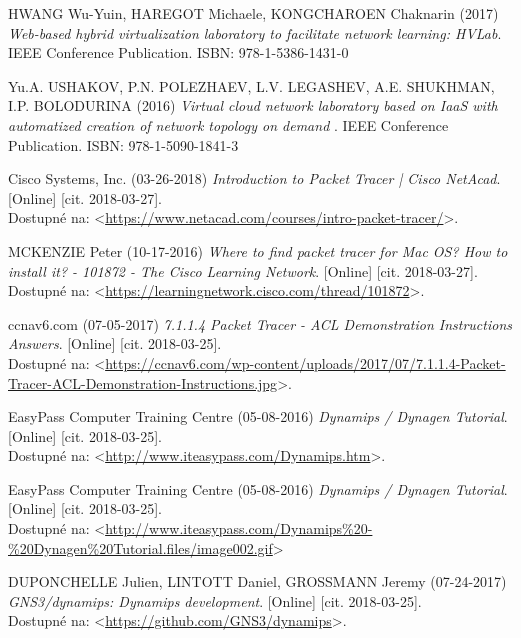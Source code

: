 \begin{thebibliography}{99}
\label{literatura}

HWANG Wu-Yuin, HAREGOT Michaele, KONGCHAROEN Chaknarin (2017) {\it Web-based hybrid virtualization laboratory to facilitate network learning: HVLab}. IEEE Conference Publication. ISBN: 978-1-5386-1431-0

Yu.A. USHAKOV, P.N. POLEZHAEV, L.V. LEGASHEV, A.E. SHUKHMAN, I.P. BOLODURINA (2016) {\it  Virtual cloud network laboratory based on IaaS with automatized creation of network topology on demand }. IEEE Conference Publication. ISBN: 978-1-5090-1841-3

Cisco Systems, Inc. (03-26-2018) {\it Introduction to Packet Tracer | Cisco NetAcad}. [Online] [cit. 2018-03-27]. \\ 
Dostupné na: <\url{https://www.netacad.com/courses/intro-packet-tracer/}>.

MCKENZIE Peter (10-17-2016) {\it Where to find packet tracer for Mac OS? How to install it? - 101872 - The Cisco Learning Network}. [Online] [cit. 2018-03-27]. \\
Dostupné na: <\url{https://learningnetwork.cisco.com/thread/101872}>.

ccnav6.com (07-05-2017) {\it 7.1.1.4 Packet Tracer - ACL Demonstration Instructions Answers}. [Online] [cit. 2018-03-25]. \\ 
Dostupné na: <\url{https://ccnav6.com/wp-content/uploads/2017/07/7.1.1.4-Packet-Tracer-ACL-Demonstration-Instructions.jpg}>.

EasyPass Computer Training Centre (05-08-2016) {\it Dynamips / Dynagen Tutorial}. [Online] [cit. 2018-03-25]. \\ 
Dostupné na: <\url{http://www.iteasypass.com/Dynamips.htm}>.

EasyPass Computer Training Centre (05-08-2016) {\it Dynamips / Dynagen Tutorial}. [Online] [cit. 2018-03-25]. \\ 
Dostupné na: <\url{http://www.iteasypass.com/Dynamips\%20-\%20Dynagen\%20Tutorial.files/image002.gif}>

DUPONCHELLE Julien, LINTOTT Daniel, GROSSMANN Jeremy (07-24-2017) {\it GNS3/dynamips: Dynamips development}. [Online] [cit. 2018-03-25]. \\ 
Dostupné na: <\url{https://github.com/GNS3/dynamips}>.


\end{thebibliography}
